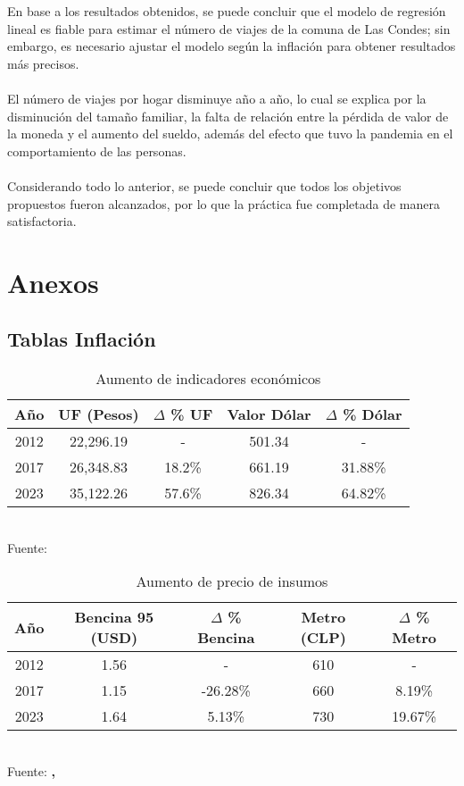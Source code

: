 \documentclass[12pt]{article} %
\begin{document}
En base a los resultados obtenidos, se puede concluir que el modelo de regresión lineal es fiable para estimar el número de viajes de la comuna de Las Condes; sin embargo, es necesario ajustar el modelo según la inflación para obtener resultados más precisos.
\\ \\
El número de viajes por hogar disminuye año a año, lo cual se explica por la disminución del tamaño familiar, la falta de relación entre la pérdida de valor de la moneda y el aumento del sueldo, además del efecto que tuvo la pandemia en el comportamiento de las personas.
\\ \\
Considerando todo lo anterior, se puede concluir que todos los objetivos propuestos fueron alcanzados, por lo que la práctica fue completada de manera satisfactoria.

\section{Anexos}

\subsection{Tablas Inflación}

\begin{table}[H]
    \centering
    \caption{Aumento de indicadores económicos}
    \vspace{0.2cm}
    \begin{tabular}{|c|c|c|c|c|}
        \hline
        Año & UF (Pesos) & $\Delta$ \% UF & Valor Dólar & $\Delta$ \% Dólar \\
        \hline
        2012 & 22,296.19 & - & 501.34 & - \\
        2017 & 26,348.83 & 18.2\% & 661.19 & 31.88\% \\
        2023 & 35,122.26 & 57.6\% & 826.34 & 64.82\% \\
        \hline
    \end{tabular}
    \vspace{0.2cm}
    \\Fuente: \textbf{\cite{sii}}
\end{table}

\begin{table}[H]
    \centering
    \caption{Aumento de precio de insumos}
    \vspace{0.2cm}
    \begin{tabular}{|c|c|c|c|c|}
        \hline
        Año & Bencina 95 (USD) & $\Delta$ \% Bencina & Metro (CLP) & $\Delta$ \% Metro \\
        \hline
        2012 & 1.56 & - & 610 & - \\
        2017 & 1.15 & -26.28\% & 660 & 8.19\% \\
        2023 & 1.64 & 5.13\% & 730 & 19.67\% \\
        \hline
    \end{tabular}
    \label{Insumos}
    \vspace{0.2cm}
    \\Fuente: \textbf{\cite{tradingeconomics}, \cite{bcentral}}
\end{table}
\end{document}
